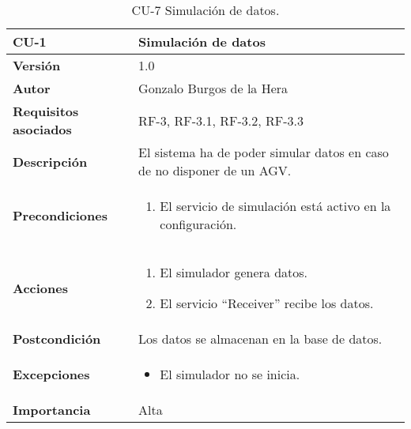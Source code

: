 \begin{table}[H]
	\centering
	\begin{tabularx}{\linewidth}{ p{} p{} }
		\toprule
		\textbf{CU-1}    & \textbf{Simulación de datos}\\
		\toprule
		\textbf{Versión}              & 1.0    \\
		\textbf{Autor}                & Gonzalo Burgos de la Hera \\
		\textbf{Requisitos asociados} & RF-3, RF-3.1, RF-3.2, RF-3.3 \\
		\textbf{Descripción}          & El sistema ha de poder simular datos en caso de no disponer de un AGV.\\
		\textbf{Precondiciones}       & 
        \begin{enumerate}
			\def\labelenumi{\arabic{enumi}.}
			\tightlist
			\item El servicio de simulación está activo en la configuración.
		\end{enumerate}\\
		\textbf{Acciones}             &
		\begin{enumerate}
			\def\labelenumi{\arabic{enumi}.}
			\tightlist
			\item El simulador genera datos.
			\item El servicio ``Receiver'' recibe los datos.
		\end{enumerate}\\
		\textbf{Postcondición}        & Los datos se almacenan en la base de datos. \\
		\textbf{Excepciones}          & 
        \begin{itemize}
			\tightlist
			\item El simulador no se inicia.
        \end{itemize} \\
		\textbf{Importancia}          & Alta \\
		\bottomrule
	\end{tabularx}
	\caption{CU-7 Simulación de datos.}
\end{table}

